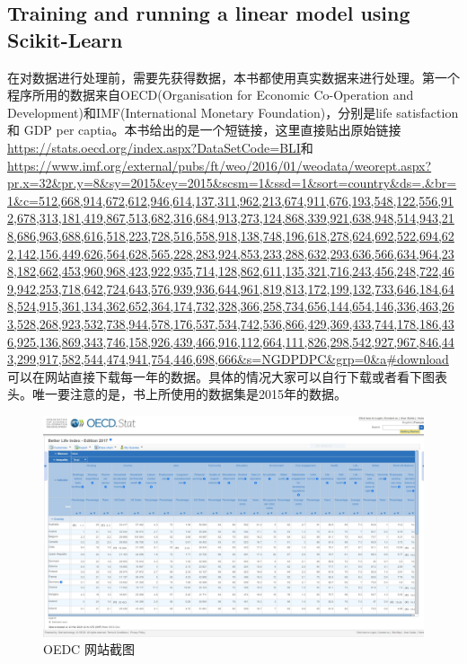 \documentclass[UTF8]{ctexart}
\begin{document}
\subsection{Training and running a linear model using Scikit-Learn}
在对数据进行处理前，需要先获得数据，本书都使用真实数据来进行处理。第一个程序所用的数据来自OECD(Organisation for Economic Co-Operation and Development)和IMF(International Monetary Foundation)，分别是life satisfaction 和 GDP per captia。本书给出的是一个短链接，这里直接贴出原始链接\url{ https://stats.oecd.org/index.aspx?DataSetCode=BLI}和
\url{https://www.imf.org/external/pubs/ft/weo/2016/01/weodata/weorept.aspx?pr.x=32&pr.y=8&sy=2015&ey=2015&scsm=1&ssd=1&sort=country&ds=.&br=1&c=512,668,914,672,612,946,614,137,311,962,213,674,911,676,193,548,122,556,912,678,313,181,419,867,513,682,316,684,913,273,124,868,339,921,638,948,514,943,218,686,963,688,616,518,223,728,516,558,918,138,748,196,618,278,624,692,522,694,622,142,156,449,626,564,628,565,228,283,924,853,233,288,632,293,636,566,634,964,238,182,662,453,960,968,423,922,935,714,128,862,611,135,321,716,243,456,248,722,469,942,253,718,642,724,643,576,939,936,644,961,819,813,172,199,132,733,646,184,648,524,915,361,134,362,652,364,174,732,328,366,258,734,656,144,654,146,336,463,263,528,268,923,532,738,944,578,176,537,534,742,536,866,429,369,433,744,178,186,436,925,136,869,343,746,158,926,439,466,916,112,664,111,826,298,542,927,967,846,443,299,917,582,544,474,941,754,446,698,666&s=NGDPDPC&grp=0&a#download}
可以在网站直接下载每一年的数据。具体的情况大家可以自行下载或者看下图表头。唯一要注意的是，书上所使用的数据集是2015年的数据。
\begin{figure}[H]
\centering
\includegraphics[width = 6in]{oedc.jpg}
\caption{OEDC 网站截图}
\end{figure}
\end{document}
